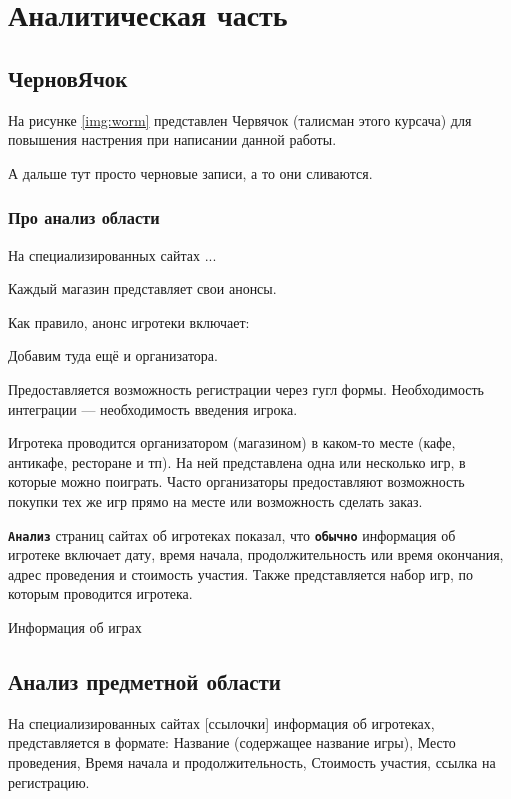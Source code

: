 \chapter{Аналитическая часть}

\section{ЧерновЯчок}

На рисунке \ref{img:worm} представлен Червячок (талисман этого курсача) для
повышения настрения при написании данной работы.


А дальше тут просто черновые записи, а то они сливаются.

\subsection{Про анализ области}

На специализированных сайтах ...

Каждый магазин представляет свои анонсы.

Как правило, анонс игротеки включает: 

Добавим туда ещё и организатора.

Предоставляется возможность регистрации через гугл формы. Необходимость
интеграции --- необходимость введения игрока.

Игротека проводится организатором (магазином) в каком-то месте (кафе, антикафе,
ресторане и тп). На ней представлена одна или несколько игр, в которые можно
поиграть. Часто организаторы предоставляют возможность покупки тех же игр прямо
на месте или возможность сделать заказ.

\textbf{\texttt{Анализ}} страниц сайтах об игротеках показал, что
\textbf{\texttt{обычно}} информация об игротеке включает дату, время начала,
продолжительность или время окончания, адрес проведения и стоимость участия.
Также представляется набор игр, по которым проводится игротека.

Информация об играх 


\section{Анализ предметной области}

На специализированных сайтах [ссылочки] информация об игротеках, представляется
в формате: Название (содержащее название игры), Место проведения, Время начала и продолжительность,
Стоимость участия, ссылка на регистрацию.

